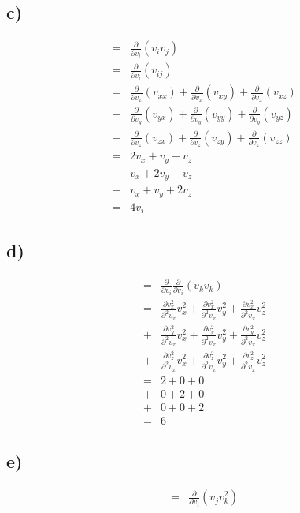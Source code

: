 \documentclass[paper=a4, fontsize=12pt]{scrartcl}
\begin{document}
\subsection*{c)}
\begin{align*}
=&\frac{\partial}{\partial v_i}(v_i v_j)\\
= &\frac{\partial}{\partial v_i}(v_{ij})\\
=&
 \frac{\partial}{\partial v_x}(v_{xx})
+\frac{\partial}{\partial v_x}(v_{xy})
+\frac{\partial}{\partial v_x}(v_{xz})\\
+& 
 \frac{\partial}{\partial v_y}(v_{yx})
+\frac{\partial}{\partial v_y}(v_{yy})
+\frac{\partial}{\partial v_y}(v_{yz})\\
+& 
 \frac{\partial}{\partial v_z}(v_{zx})
+\frac{\partial}{\partial v_z}(v_{zy})
+\frac{\partial}{\partial v_z}(v_{zz})\\
=& 
	2v_x + v_y + v_z\\
+&	v_x + 2v_y + v_z\\
+& 	v_x + v_y + 2v_z \\
=& 4v_i
\end{align*}

\subsection*{d)}
\begin{align*}
=&
\frac{\partial}{\partial v_i} \frac{\partial}{\partial v_i}(v_k v_k)\\
=& 
  \frac{\partial v^2_x}{\partial ^2 v_x}  v_x^2
+ \frac{\partial v^2_x}{\partial ^2 v_x}  v_y^2
+ \frac{\partial v^2_x}{\partial ^2 v_x}  v_z^2\\
+& 
  \frac{\partial v^2_y}{\partial ^2 v_x}  v_x^2
+ \frac{\partial v^2_y}{\partial ^2 v_x}  v_y^2
+ \frac{\partial v^2_y}{\partial ^2 v_x}  v_z^2\\
+&
  \frac{\partial v^2_z}{\partial ^2 v_x}  v_x^2
+ \frac{\partial v^2_z}{\partial ^2 v_x}  v_y^2
+ \frac{\partial v^2_z}{\partial ^2 v_x}  v_z^2\\
=& 
2 + 0 + 0 \\
+& 0 + 2 + 0\\
+& 0 + 0 + 2\\
=& 6
\end{align*}

\subsection*{e)}
\begin{align*}
=& \frac{\partial}{\partial v_i}(v_j v_k^2)\\
\end{align*}
\end{document}
